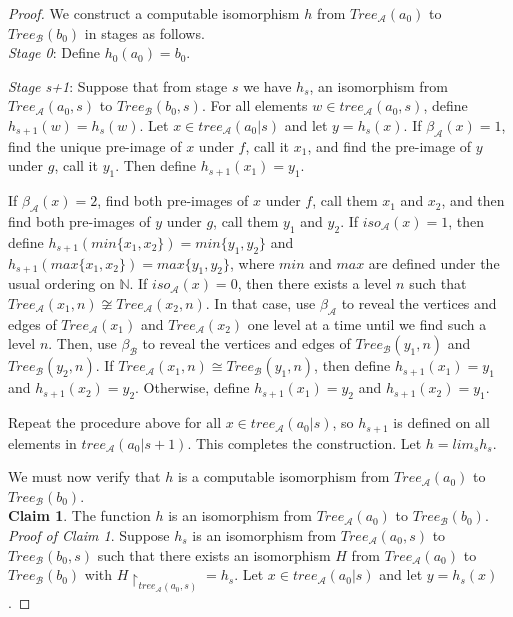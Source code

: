 \documentclass[12pt]{article}
\begin{document}
\begin{proof}
We construct a computable isomorphism $h$ from $Tree_\mathcal{A} (a_0)$ to $Tree_\mathcal{B} (b_0)$ in stages as follows.\\

\emph{Stage 0}: Define $h_0(a_0) = b_0$.

\emph{Stage s+1}: Suppose that from stage $s$ we have $h_s$, an isomorphism from $Tree_\mathcal{A} (a_0, s)$ to $Tree_\mathcal{B} (b_0, s)$. For all elements $w \in tree_\mathcal{A}(a_0,s)$, define $h_{s+1}(w)=h_s(w)$. Let $x \in tree_\mathcal{A} (a_0|s)$ and let $y = h_s(x)$. If $\beta_{\mathcal{A}}(x)=1$, find the unique pre-image of $x$ under $f$, call it $x_1$, and find the pre-image of $y$ under $g$, call it $y_1$. Then define $h_{s+1}(x_1)=y_1$. 

If $\beta_{\mathcal{A}}(x)=2$, find both pre-images of $x$ under $f$, call them $x_1$ and $x_2$, and then find both pre-images of $y$ under $g$, call them $y_1$ and $y_2$. If $iso_\mathcal{A}(x) = 1$, then define $h_{s+1}(min\{x_1,x_2\})=min\{y_1,y_2\}$ and $h_{s+1}(max\{x_1,x_2\}) = max\{y_1,y_2\}$, where $min$ and $max$ are defined under the usual ordering on $\mathbb{N}$. If $iso_\mathcal{A}(x) = 0$, then there exists a level $n$ such that $Tree_\mathcal{A}(x_1,n) \not\cong Tree_\mathcal{A}(x_2,n)$. In that case, use $\beta_{\mathcal{A}}$ to reveal the vertices and edges of $Tree_\mathcal{A}(x_1)$ and $Tree_\mathcal{A}(x_2)$ one level at a time until we find such a level $n$. Then, use $\beta_{\mathcal{B}}$ to reveal the vertices and edges of $Tree_\mathcal{B}(y_1,n)$ and $Tree_\mathcal{B}(y_2,n)$. If $Tree_\mathcal{A}(x_1,n) \cong Tree_\mathcal{B}(y_1,n)$, then define $h_{s+1}(x_1)=y_1$ and $h_{s+1}(x_2)=y_2$. Otherwise, define $h_{s+1}(x_1)=y_2$ and $h_{s+1}(x_2)=y_1$. 

Repeat the procedure above for all $x \in tree_\mathcal{A} (a_0|s)$, so $h_{s+1}$ is defined on all elements in $tree_\mathcal{A} (a_0|s+1)$. This completes the construction. Let $h = lim_s h_s$.

We must now verify that $h$ is a computable isomorphism from $Tree_\mathcal{A} (a_0)$ to $Tree_\mathcal{B} (b_0)$.\\

\textbf{Claim 1}. The function $h$ is an isomorphism from $Tree_\mathcal{A} (a_0)$ to $Tree_\mathcal{B} (b_0)$.\\

\emph{Proof of Claim 1}. Suppose $h_s$ is an isomorphism from $Tree_\mathcal{A} (a_0,s)$ to $Tree_\mathcal{B} (b_0,s)$ such that there exists an isomorphism $H$ from $Tree_\mathcal{A} (a_0)$ to $Tree_\mathcal{B} (b_0)$ with $H\restriction_{tree_\mathcal{A}(a_0,s)}=h_s$. Let $x \in tree_\mathcal{A} (a_0|s)$ and let $y = h_s(x)$. 


\end{proof}
\end{document}
